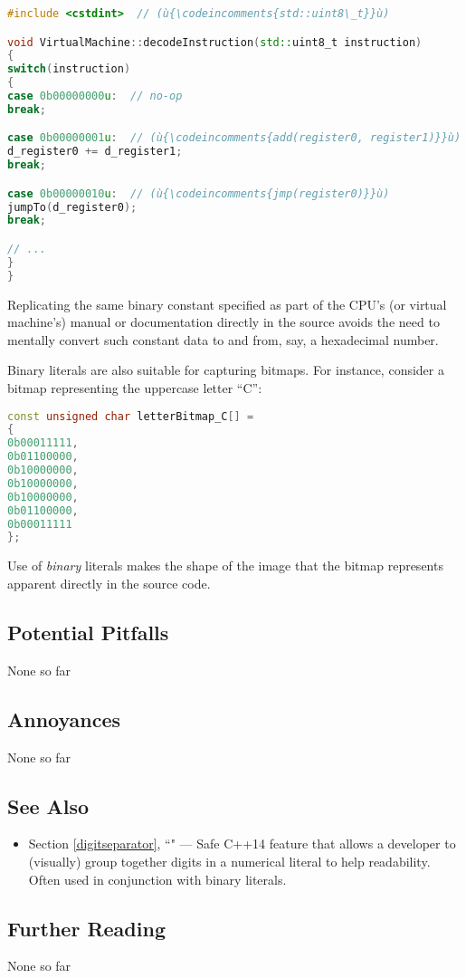 \begin{lstlisting}[language=C++]
#include <cstdint>  // (ù{\codeincomments{std::uint8\_t}}ù)

void VirtualMachine::decodeInstruction(std::uint8_t instruction)
{
switch(instruction)
{
case 0b00000000u:  // no-op
break;

case 0b00000001u:  // (ù{\codeincomments{add(register0, register1)}}ù)
d_register0 += d_register1;
break;

case 0b00000010u:  // (ù{\codeincomments{jmp(register0)}}ù)
jumpTo(d_register0);
break;

// ...
}
}
\end{lstlisting}


\noindent Replicating the same binary constant specified as part of the CPU's (or
virtual machine's) manual or documentation directly in the source avoids the need to
mentally convert such constant data to and from, say, a hexadecimal
number.

Binary literals are also suitable for capturing bitmaps. For instance,
consider a bitmap representing the uppercase letter ``C'':

\begin{lstlisting}[language=C++]
const unsigned char letterBitmap_C[] =
{
0b00011111,
0b01100000,
0b10000000,
0b10000000,
0b10000000,
0b01100000,
0b00011111
};
\end{lstlisting}


\noindent Use of \emph{binary} literals makes the shape of the image that the
bitmap represents apparent directly in the source code.

\subsection[Potential Pitfalls]{Potential Pitfalls}\label{potential-pitfalls}

None so far

\subsection[Annoyances]{Annoyances}\label{annoyances}

None so far

\subsection[See Also]{See Also}\label{see-also}

\begin{itemize}
\item{Section \ref{digitseparator}, ``" — Safe C++14 feature that allows a developer to (visually) group together digits in a numerical literal to help readability. Often used in conjunction with binary literals.}
\end{itemize}

\subsection[Further Reading]{Further Reading}\label{further-reading}

None so far


